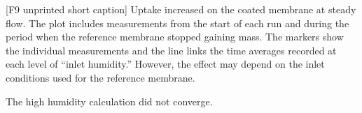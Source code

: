 [F9 unprinted short caption]{
Uptake increased on the coated membrane at steady flow.
The plot includes measurements from the start of each run and during the period when the reference membrane stopped gaining mass.
The markers show the individual measurements and the line links the time averages recorded at each level of “inlet humidity.”
However, the effect may depend on the inlet conditions used for the reference membrane.
}

The high humidity calculation did not converge.
